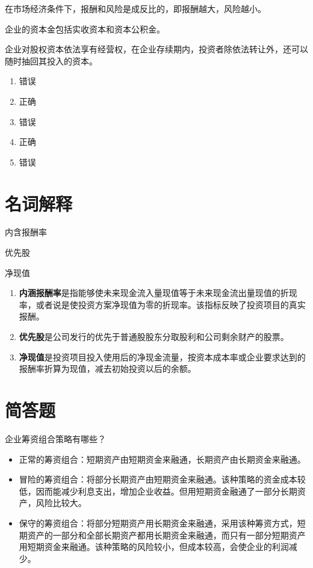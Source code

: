 \documentclass[
  10pt,
  twoside,
  openany,
  b5paper, %
  colorscheme = black, %
  xits = false,
]{qyxf-book}
\begin{document}
 在市场经济条件下，报酬和风险是成反比的，即报酬越大，风险越小。

 企业的资本金包括实收资本和资本公积金。

 企业对股权资本依法享有经营权，在企业存续期内，投资者除依法转让外，还可以随时抽回其投入的资本。

\begin{note}
	\begin{enumerate}
		\item 错误
		\item 正确
		\item 错误
		\item 正确
		\item 错误
	\end{enumerate}
\end{note}

\section{名词解释}

 内含报酬率

 优先股

 净现值

\begin{note}
	\begin{enumerate}
		\item \textbf{内涵报酬率}是指能够使未来现金流入量现值等于未来现金流出量现值的折现率，或者说是使投资方案净现值为零的折现率。该指标反映了投资项目的真实报酬。
		\item \textbf{优先股}是公司发行的优先于普通股股东分取股利和公司剩余财产的股票。
		\item \textbf{净现值}是投资项目投入使用后的净现金流量，按资本成本率或企业要求达到的报酬率折算为现值，减去初始投资以后的余额。
	\end{enumerate}
\end{note}

\newpage

\section{简答题}
 企业筹资组合策略有哪些？

\begin{note}
	\begin{itemize}
		\item 正常的筹资组合：短期资产由短期资金来融通，长期资产由长期资金来融通。
		\item 冒险的筹资组合：将部分长期资产由短期资金来融通。该种策略的资金成本较低，因而能减少利息支出，增加企业收益。但用短期资金融通了一部分长期资产，风险比较大。
		\item 保守的筹资组合：将部分短期资产用长期资金来融通，采用该种筹资方式，短期资产的一部分和全部长期资产都用长期资金来融通，而只有一部分短期资产用短期资金来融通。该种策略的风险较小，但成本较高，会使企业的利润减少。
	\end{itemize}
\end{note}
\end{document}
